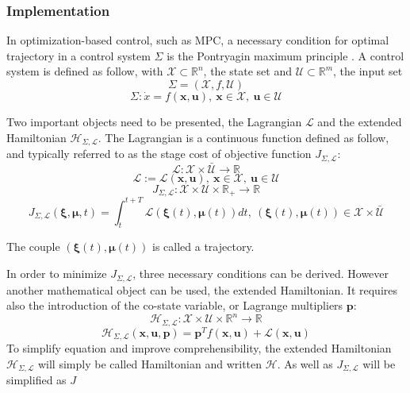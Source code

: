 \documentclass[a4paper, 12pt]{report}
\begin{document}
\subsubsection{Implementation}
In optimization-based control, such as MPC, a necessary condition for optimal trajectory in a control system $\Sigma$ is the Pontryagin maximum principle \cite{Pontryagin1987, Lewis2006, Murray2010}. A control system is defined as follow, with $\mathcal{X} \subset \mathbb{R}^n$, the state set and $\mathcal{U} \subset \mathbb{R}^m$, the input set
\[ \Sigma = (\mathcal{X}, f, \mathcal{U}) \]
\[ \Sigma: \dot x = f(\boldsymbol{x}, \boldsymbol{u}),\ \boldsymbol{x} \in \mathcal{X},\ \boldsymbol{u} \in \mathcal{U} \]

Two important objects need to be presented, the Lagrangian $\mathcal{L}$ and the extended Hamiltonian $\mathcal{H}_{\Sigma,\mathcal{L}}$. The Lagrangian is a continuous function defined as follow, and typically referred to as the stage cost of objective function $J_{\Sigma,\mathcal{L}}$:
\[ \mathcal{L}: \mathcal{X} \times \bar{\mathcal{U}} \rightarrow \mathbb{R} \]
\[ \mathcal{L} := \mathcal{L}(\boldsymbol{x}, \boldsymbol{u}),\ \boldsymbol{x} \in \mathcal{X},\ \boldsymbol{u} \in \mathcal{U} \]
\[ J_{\Sigma,\mathcal{L}}: \mathcal{X} \times \mathcal{U} \times \mathbb{R_+} \rightarrow \mathbb{R} \]
\[ J_{\Sigma,\mathcal{L}}(\boldsymbol{\xi}, \boldsymbol{\mu}, t) = \int_{t}^{t+T} \mathcal{L}(\boldsymbol{\xi}(t), \boldsymbol{\mu}(t))dt, \ (\boldsymbol{\xi}(t), \boldsymbol{\mu}(t)) \in  \mathcal{X} \times \bar{\mathcal{U}}\]

The couple $(\boldsymbol{\xi}(t), \boldsymbol{\mu}(t))$ is called a trajectory.

In order to minimize  $J_{\Sigma,\mathcal{L}}$, three necessary conditions can be derived. However another mathematical object can be used, the extended Hamiltonian. It requires also the introduction of the co-state variable, or Lagrange multipliers $\boldsymbol{p}$:
\[ \mathcal{H}_{\Sigma,\mathcal{L}}: \mathcal{X} \times \mathcal{U} \times \mathbb{R}^n \rightarrow \mathbb{R} \]
\[ \mathcal{H}_{\Sigma,\mathcal{L}}(\boldsymbol{x}, \boldsymbol{u}, \boldsymbol{p}) = \boldsymbol{p}^Tf(\boldsymbol{x}, \boldsymbol{u}) + \mathcal{L}(\boldsymbol{x}, \boldsymbol{u}) \]
To simplify equation and improve comprehensibility, the extended Hamiltonian $\mathcal{H}_{\Sigma,\mathcal{L}}$ will simply be called Hamiltonian and written $\mathcal{H}$. As well as $J_{\Sigma,\mathcal{L}}$ will be simplified as $J$
\end{document}
